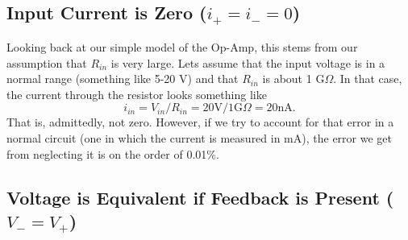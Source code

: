 \subsection*{Input Current is Zero ($i_+=i_-=0$)}
Looking back at our simple model of the Op-Amp, this stems from our assumption that $R_{in}$ is very large.  Lets assume that the input voltage is in a normal range (something like 5-20 V) and that $R_{in}$ is about 1 G$\Omega$.  In that case, the current through the resistor looks something like
\begin{equation*}
  i_{in}=V_{in}/R_{in}=20 \text{V} / 1\text{G}\Omega = 20 \text{nA}.
\end{equation*}
  That is, admittedly, not zero.  However, if we try to account for that error in a normal circuit (one in which the current is measured in mA), the error we get from neglecting it is on the order of 0.01\%.
\subsection*{ Voltage is Equivalent if Feedback is Present ($V_-=V_+$)}
